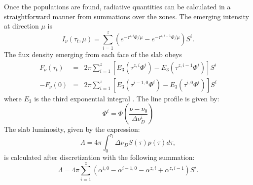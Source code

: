 \documentclass[12pt]{article}
\def\non{\nonumber \\}
\def\tot      {\tau_t}
\def\t(#1){\tau^{#1}}
\begin{document}
Once the populations are found, radiative quantities can be calculated in a
straightforward manner from summations over the zones. The emerging intensity
at direction $\mu$ is
\begin{equation}
    I_\nu(\tot,\mu) = \sum_{i = 1}^z
     \left(e^{-\tau^{z,i}\Phi/\mu} -  e^{-\tau^{z,i - 1}\Phi/\mu}\right)S^i.
\end{equation}
The flux density emerging from each face of the slab obeys
\begin{eqnarray}
    F_\nu(\tot) &=& 2\pi\sum_{i = 1}^z
    \left[E_3(\tau^{z,i}\Phi^i) - E_3(\tau^{z,i - 1}\Phi^i)\right] S^i \non
    -F_\nu(0)  &=& 2\pi \sum_{i = 1}^z
    \left[E_3(\t(i - 1,0)\Phi^i) - E_3(\t(i,0)\Phi^i)\right] S^i
\end{eqnarray}
where $E_3$ is the third exponential integral \citep[e.g.,][]{abramowitz72}. The line profile
is given by:
\begin{equation}
\Phi^i = \Phi \left( \frac{\nu-\nu_0}{\Delta \nu_D^i} \right)
\end{equation}
The slab luminosity, given
by the expression:
\begin{equation}
\Lambda = 4 \pi \int_0^{\tot} \Delta \nu_D S(\tau)p(\tau)d\tau,
\end{equation}
is calculated after discretization with the following summation:
\begin{equation}
\Lambda = 4 \pi \sum_{i = 1}^z
 \left(\alpha^{i,0} - \alpha^{i-1,0} - \alpha^{z,i} + \alpha^{z,i-1}\right)S^i.
\end{equation}





\end{document}
